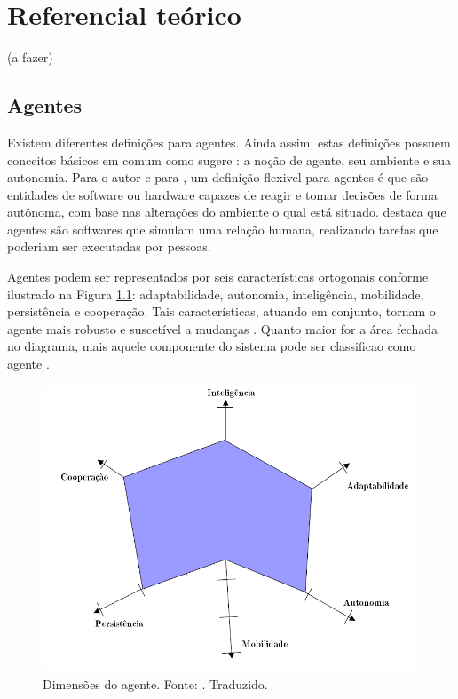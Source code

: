 \chapter[Referencial teórico]{Referencial teórico}\label{ch:referencial}

(a fazer)

\cite{serrano2011}
\cite{jennings2000}
\cite{zambonelli2001}

\section{Agentes}

Existem diferentes definições para agentes. Ainda assim, estas definições possuem conceitos básicos em comum como sugere : a noção de agente, seu ambiente e sua autonomia. Para o autor e para , um definição flexivel para agentes é que são entidades de software ou hardware capazes de reagir e tomar decisões de forma autônoma, com base nas alterações do ambiente o qual está situado.  destaca que agentes são softwares que simulam uma relação humana, realizando tarefas que poderiam ser executadas por pessoas.

Agentes podem ser representados por seis características ortogonais conforme ilustrado na Figura \ref{fig:hexagono}: adaptabilidade, autonomia, inteligência, mobilidade, persistência e cooperação. Tais características, atuando em conjunto, tornam o agente mais robusto e suscetível a mudanças \cite{griss2001software}. Quanto maior for a área fechada no diagrama, mais aquele componente do sistema pode ser classificao como agente \cite{griss2001software}.

\begin{figure}[h!]
    \includegraphics[scale=0.4]{figuras/hexagono_agente}
    \centering
    \caption{Dimensões do agente. Fonte: \cite{griss2001software}. Traduzido.}
    \label{fig:hexagono}
\end{figure}


